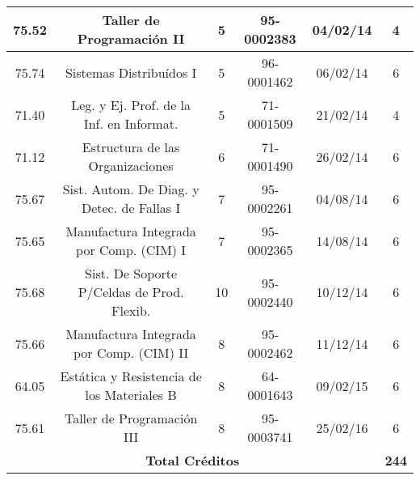 \begin{center}
\begin{tabular}{|c|c|c|c|c|c|}
            \hline
            75.52 & Taller de Programación II                  & 5  & 95-0002383 & 04/02/14 & 4 \\
            \hline 
            75.74 & Sistemas Distribuídos I                    & 5  & 96-0001462 & 06/02/14 & 6 \\
            \hline
            71.40 & Leg. y Ej. Prof. de la Inf. en Informat.   & 5  & 71-0001509 & 21/02/14 & 4 \\
            \hline
            71.12 & Estructura de las Organizaciones           & 6  & 71-0001490 & 26/02/14 & 6 \\
            \hline
            75.67 & Sist. Autom. De Diag. y Detec. de Fallas I & 7  & 95-0002261 & 04/08/14 & 6 \\
            \hline
            75.65 & Manufactura Integrada por Comp. (CIM) I    & 7  & 95-0002365 & 14/08/14 & 6 \\
            \hline
            75.68 & Sist. De Soporte P/Celdas de Prod. Flexib. & 10 & 95-0002440 & 10/12/14 & 6 \\
            \hline
            75.66 & Manufactura Integrada por Comp. (CIM) II   & 8  & 95-0002462 & 11/12/14 & 6 \\
            \hline
            64.05 & Estática y Resistencia de los Materiales B & 8  & 64-0001643 & 09/02/15 & 6 \\
            \hline
            75.61 & Taller de Programación III                 & 8  & 95-0003741 & 25/02/16 & 6 \\
            \hline
            \multicolumn{5}{|c|}{\textbf{Total Créditos}} & \textbf{244} \\
            \hline
        \end{tabular}
        \end{center}
